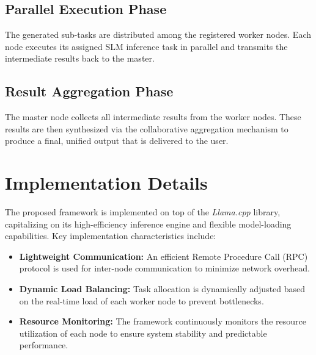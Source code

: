 \subsection{Parallel Execution Phase}
The generated sub-tasks are distributed among the registered worker nodes. Each node executes its assigned SLM inference task in parallel and transmits the intermediate results back to the master.

\subsection{Result Aggregation Phase}
The master node collects all intermediate results from the worker nodes. These results are then synthesized via the collaborative aggregation mechanism to produce a final, unified output that is delivered to the user.

\section{Implementation Details}

The proposed framework is implemented on top of the \textit{Llama.cpp} library, capitalizing on its high-efficiency inference engine and flexible model-loading capabilities. Key implementation characteristics include:

\begin{itemize}
    \item \textbf{Lightweight Communication:} An efficient Remote Procedure Call (RPC) protocol is used for inter-node communication to minimize network overhead.
    \item \textbf{Dynamic Load Balancing:} Task allocation is dynamically adjusted based on the real-time load of each worker node to prevent bottlenecks.
    \item \textbf{Resource Monitoring:} The framework continuously monitors the resource utilization of each node to ensure system stability and predictable performance.
\end{itemize} 